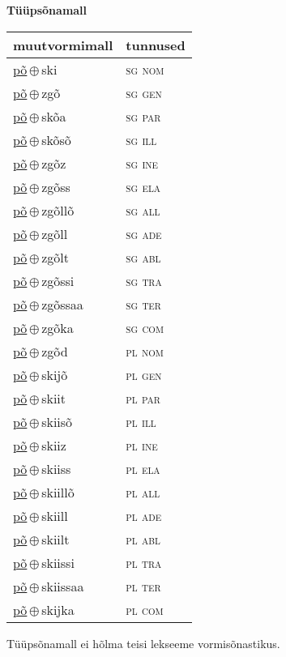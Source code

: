 

\vspace{3.5em}
\noindent \begin{minipage}{\textwidth}
\noindent \textbf{Tüüpsõnamall \,}\\

\begin{sideways}
\begin{tabular}{l l}
muutvormimall & tunnused \\
\hline
\underline{põ}\,$\oplus$\,ski & \textsc{ sg nom } \\
\underline{põ}\,$\oplus$\,zgõ & \textsc{ sg gen } \\
\underline{põ}\,$\oplus$\,skõa & \textsc{ sg par } \\
\underline{põ}\,$\oplus$\,skõsõ & \textsc{ sg ill } \\
\underline{põ}\,$\oplus$\,zgõz & \textsc{ sg ine } \\
\underline{põ}\,$\oplus$\,zgõss & \textsc{ sg ela } \\
\underline{põ}\,$\oplus$\,zgõllõ & \textsc{ sg all } \\
\underline{põ}\,$\oplus$\,zgõll & \textsc{ sg ade } \\
\underline{põ}\,$\oplus$\,zgõlt & \textsc{ sg abl } \\
\underline{põ}\,$\oplus$\,zgõssi & \textsc{ sg tra } \\
\underline{põ}\,$\oplus$\,zgõssaa & \textsc{ sg ter } \\
\underline{põ}\,$\oplus$\,zgõka & \textsc{ sg com } \\
\underline{põ}\,$\oplus$\,zgõd & \textsc{ pl nom } \\
\underline{põ}\,$\oplus$\,skijõ & \textsc{ pl gen } \\
\underline{põ}\,$\oplus$\,skiit & \textsc{ pl par } \\
\underline{põ}\,$\oplus$\,skiisõ & \textsc{ pl ill } \\
\underline{põ}\,$\oplus$\,skiiz & \textsc{ pl ine } \\
\underline{põ}\,$\oplus$\,skiiss & \textsc{ pl ela } \\
\underline{põ}\,$\oplus$\,skiillõ & \textsc{ pl all } \\
\underline{põ}\,$\oplus$\,skiill & \textsc{ pl ade } \\
\underline{põ}\,$\oplus$\,skiilt & \textsc{ pl abl } \\
\underline{põ}\,$\oplus$\,skiissi & \textsc{ pl tra } \\
\underline{põ}\,$\oplus$\,skiissaa & \textsc{ pl ter } \\
\underline{põ}\,$\oplus$\,skijka & \textsc{ pl com } \\
\end{tabular}
\end{sideways}
\label{tab:tüüpsõnamall-põski}

\end{minipage}

 
\vspace{1em}
\noindent Tüüpsõnamall  ei hõlma teisi lekseeme vormi\-sõnastikus.
